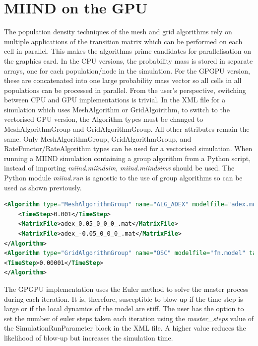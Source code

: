 \documentclass[utf8]{frontiersSCNS} %
\begin{document}
\section{MIIND on the GPU}
\label{mainmiindgpu}
The population density techniques of the mesh and grid algorithms rely on multiple applications of the transition matrix which can be performed on each cell in parallel. This makes the algorithms prime candidates for parallelisation on the graphics card. In the CPU versions, the probability mass is stored in separate arrays, one for each population/node in the simulation. For the GPGPU version, these are concatenated into one large probability mass vector so all cells in all populations can be processed in parallel. From the user’s perspective, switching between CPU and GPU implementations is trivial. In the XML file for a simulation which uses MeshAlgorithm or GridAlgoirithm, to switch to the vectorised GPU version, the Algorithm types must be changed to MeshAlgorithmGroup and GridAlgorithmGroup. All other attributes remain the same. Only MeshAlgorithmGroup, GridAlgorithmGroup, and RateFunctor/RateAlgorithm types can be used for a vectorised simulation. When running a MIIND simulation containing a group algorithm from a Python script, instead of importing \textit{miind.miindsim}, \textit{miind.miindsimv} should be used. The Python module \textit{miind.run} is agnostic to the use of group algorithms so can be used as shown previously.

\begin{lstlisting}[language=xml,caption={A MeshAlgorithmGroup definition is identical to a MeshAlgorithm definition except for the type.}]
<Algorithm type="MeshAlgorithmGroup" name="ALG_ADEX" modelfile="adex.model" >
	<TimeStep>0.001</TimeStep>
	<MatrixFile>adex_0.05_0_0_0_.mat</MatrixFile>
	<MatrixFile>adex_-0.05_0_0_0_.mat</MatrixFile>
</Algorithm>
<Algorithm type="GridAlgorithmGroup" name="OSC" modelfile="fn.model" tau_refractive="0.0" transformfile="fn_0_0_0_0_.tmat" start_v="-1.0" start_w="-0.3" ratemethod="AvgV">
<TimeStep>0.00001</TimeStep>
</Algorithm>
\end{lstlisting}

The GPGPU implementation uses the Euler method to solve the master process during each iteration. It is, therefore, susceptible to blow-up if the time step is large or if the local dynamics of the model are stiff. The user has the option to set the number of euler steps taken each iteration using the \textit{master\_steps} value of the SimulationRunParameter block in the XML file. A higher value reduces the likelihood of blow-up but increases the simulation time. \\
 
\end{document}

